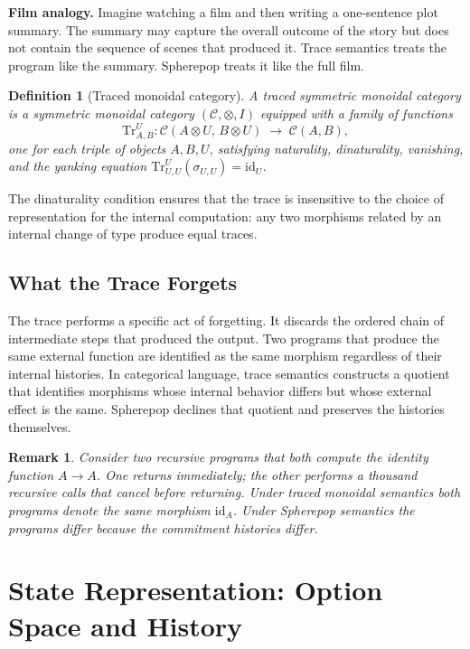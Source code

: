 \documentclass[12pt]{article}
\newtheorem{definition}{Definition}[section]
\newtheorem{remark}{Remark}[section]
\begin{document}
\medskip\noindent\textbf{Film analogy.} Imagine watching a film and then writing a one-sentence plot summary. The summary may capture the overall outcome of the story but does not contain the sequence of scenes that produced it. Trace semantics treats the program like the summary. Spherepop treats it like the full film.\medskip

\begin{definition}[Traced monoidal category]
A \emph{traced symmetric monoidal category} is a symmetric monoidal category $(\mathcal{C}, \otimes, I)$ equipped with a family of functions
\[
\mathrm{Tr}^U_{A,B} : \mathcal{C}(A \otimes U,\, B \otimes U) \;\longrightarrow\; \mathcal{C}(A, B),
\]
one for each triple of objects $A, B, U$, satisfying naturality, dinaturality, vanishing, and the yanking equation $\mathrm{Tr}^U_{U,U}(\sigma_{U,U}) = \mathrm{id}_U$.
\end{definition}

The dinaturality condition ensures that the trace is insensitive to the choice of representation for the internal computation: any two morphisms related by an internal change of type produce equal traces.

\subsection{What the Trace Forgets}

The trace performs a specific act of forgetting. It discards the ordered chain of intermediate steps that produced the output. Two programs that produce the same external function are identified as the same morphism regardless of their internal histories. In categorical language, trace semantics constructs a quotient that identifies morphisms whose internal behavior differs but whose external effect is the same. Spherepop declines that quotient and preserves the histories themselves.

\begin{remark}
Consider two recursive programs that both compute the identity function $A \to A$. One returns immediately; the other performs a thousand recursive calls that cancel before returning. Under traced monoidal semantics both programs denote the same morphism $\mathrm{id}_A$. Under Spherepop semantics the programs differ because the commitment histories differ.
\end{remark}

\section{State Representation: Option Space and History}
\label{sec:state}
\end{document}
